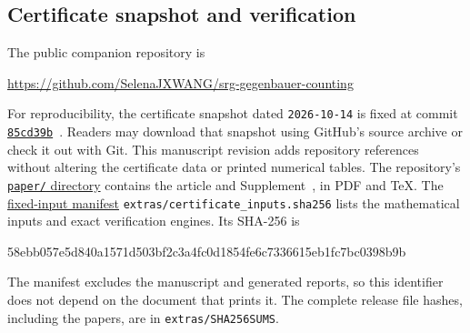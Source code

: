 \documentclass[11pt]{article}
\theoremstyle{remark}
\numberwithin{equation}{section}
\begin{document}
\subsection{Certificate snapshot and verification}\label{app:delivery}
The public companion repository is
\begin{center}\small
\url{https://github.com/SelenaJXWANG/srg-gegenbauer-counting}
\end{center}
For reproducibility, the certificate snapshot dated \texttt{2026-10-14}
is fixed at commit
\href{https://github.com/SelenaJXWANG/srg-gegenbauer-counting/tree/85cd39b74c9ef8a61ab746deb1102af3eeae7e10}{\texttt{85cd39b}}~\cite{certificateData}.
Readers may download that snapshot using GitHub's source archive or
check it out with Git. This manuscript revision adds repository
references without altering the certificate data or printed numerical tables.
The repository's \href{https://github.com/SelenaJXWANG/srg-gegenbauer-counting/tree/main/paper}{\texttt{paper/} directory}
contains the article and Supplement~\cite{supp405}, in PDF and TeX.
The \href{https://github.com/SelenaJXWANG/srg-gegenbauer-counting/blob/85cd39b74c9ef8a61ab746deb1102af3eeae7e10/extras/certificate_inputs.sha256}{fixed-input manifest}
\nolinkurl{extras/certificate_inputs.sha256} lists the mathematical
inputs and exact verification engines. Its SHA-256 is
\begin{center}\small\ttfamily
58ebb057e5d840a1571d503bf2c3a4fc0d1854fe6c7336615eb1fc7bc0398b9b
\end{center}
The manifest excludes the manuscript and generated reports, so this
identifier does not depend on the document that prints it. The complete
release file hashes, including the papers, are in
\nolinkurl{extras/SHA256SUMS}.
\end{document}
